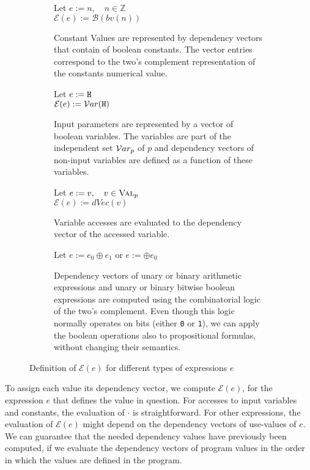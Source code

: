 \begin{figure}
    \begin{subfigure}{1\textwidth}
    \centering
        Let $e := n, \quad n \in \mathbb{Z}$\\
        $\mathcal{E}(e) := \mathcal{B}(bv(n))$
        \caption{Constant Values are represented by dependency vectors that contain of boolean constants. The vector entries correspond to the two's complement representation of the constants numerical value.}
    \end{subfigure}
    \bigskip
    \begin{subfigure}{1\textwidth}
        \centering
        Let $e := \mathtt{H}$\\
        $\mathcal{E}(e) := \mathcal{V}ar(\mathtt{H})$
        \caption{Input parameters are represented by a vector of boolean variables. The variables are part of the independent set $\mathcal{V}ar_p$ of $p$ and dependency vectors of non-input variables are defined as a function of these variables.}
    \end{subfigure}
    \bigskip
    \begin{subfigure}{1\textwidth}
        \centering
        Let $e := v, \quad v \in \textsc{Val}_p$\\
        $\mathcal{E}(e) := dVec(v)$
        \caption{Variable accesses are evaluated to the dependency vector of the accessed variable.}
    \end{subfigure}
    \bigskip
    \begin{subfigure}{1\textwidth}
    \centering
    Let $e := e_0 \oplus e_1$ or $e := \oplus e_0$
       \caption{Dependency vectors of unary or binary arithmetic expressions and unary or binary bitwise boolean expressions are computed using the combinatorial logic of the two's complement. Even though this logic normally operates on bits (either \texttt{0} or \texttt{1}), we can apply the boolean operations also to propositional formulas, without changing their semantics.}
    \end{subfigure}
    \caption{Definition of $\mathcal{E}(e)$ for different types of expressions $e$}\label{fig:expr}
\end{figure}

To assign each value its dependency vector, we compute $\mathcal{E}(e)$, for the expression $e$ that defines the value in question. For accesses to input variables and constants, the evaluation of $\mathcal{\cdot}$ is straightforward. For other expressions, the evaluation of $\mathcal{E}(e)$ might depend on the dependency vectors of use-values of $e$. We can guarantee that the needed dependency values have previously been computed, if we evaluate the dependency vectors of program values in the order in which the values are defined in the program.

